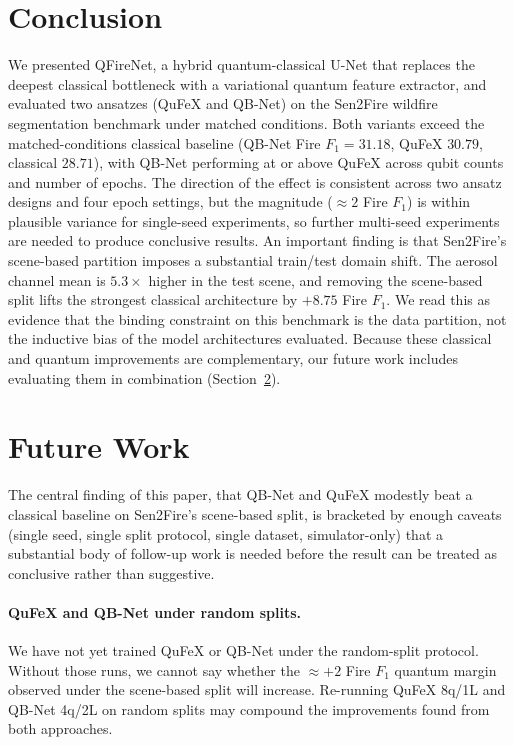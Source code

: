 \documentclass{article}
\newcommand{\projectname}{QFireNet}
\begin{document}
\section{Conclusion}
\label{sec:conclusion}

We presented \projectname, a hybrid quantum-classical U-Net that replaces the deepest classical bottleneck with a variational quantum feature extractor, and evaluated two ansatzes (QuFeX and QB-Net) on the Sen2Fire wildfire segmentation benchmark under matched conditions. Both variants exceed the matched-conditions classical baseline (QB-Net Fire $F_1 = 31.18$, QuFeX $30.79$, classical $28.71$), with QB-Net performing at or above QuFeX across qubit counts and number of epochs. The direction of the effect is consistent across two ansatz designs and four epoch settings, but the magnitude ($\approx 2$ Fire $F_1$) is within plausible variance for single-seed experiments, so further multi-seed experiments are needed to produce conclusive results. An important finding is that Sen2Fire's scene-based partition imposes a substantial train/test domain shift. The aerosol channel mean is $5.3\times$ higher in the test scene, and removing the scene-based split lifts the strongest classical architecture by $+8.75$ Fire $F_1$. We read this as evidence that the binding constraint on this benchmark is the data partition, not the inductive bias of the model architectures evaluated. Because these classical and quantum improvements are complementary, our future work includes evaluating them in combination (Section~\ref{sec:futurework}).

\section{Future Work}
\label{sec:futurework}

The central finding of this paper, that QB-Net and QuFeX modestly beat a classical baseline on Sen2Fire's scene-based split, is bracketed by enough caveats (single seed, single split protocol, single dataset, simulator-only) that a substantial body of follow-up work is needed before the result can be treated as conclusive rather than suggestive.

\paragraph{QuFeX and QB-Net under random splits.} We have not yet trained QuFeX or QB-Net under the random-split protocol. Without those runs, we cannot say whether the $\approx +2$ Fire $F_1$ quantum margin observed under the scene-based split will increase. Re-running QuFeX 8q/1L and QB-Net 4q/2L on random splits may compound the improvements found from both approaches.
\end{document}
